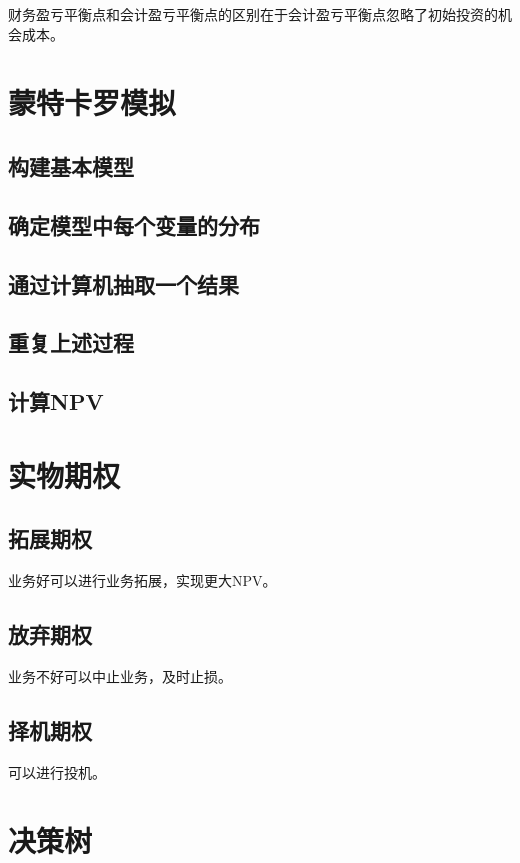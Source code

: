 \documentclass{article}
\begin{document}
\hspace*{\fill}

财务盈亏平衡点和会计盈亏平衡点的区别在于会计盈亏平衡点忽略了初始投资的机会成本。
 
\section{蒙特卡罗模拟}
\subsection{构建基本模型}
\subsection{确定模型中每个变量的分布}
\subsection{通过计算机抽取一个结果}
\subsection{重复上述过程}
\subsection{计算NPV}

\section{实物期权}
\subsection{拓展期权}
业务好可以进行业务拓展，实现更大NPV。
\subsection{放弃期权}
业务不好可以中止业务，及时止损。
\subsection{择机期权}
可以进行投机。

\section{决策树}
\end{document}
